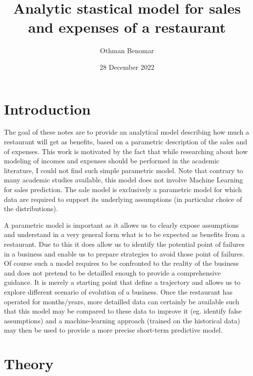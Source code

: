 \documentclass{article}
\title{Analytic stastical model for sales and expenses of a restaurant}
\date{28 December 2022\\}
\author{Othman Benomar}
\begin{document}
\maketitle
\section{Introduction} \label{sec:1} 
The goal of these notes are to provide an analytical model describing how much a restaurant will get as benefits, based on a parametric description of the sales and of expenses. This work is motivated by the fact that while researching about how modeling of incomes and expenses should be performed in the academic literature, I could not find such simple parametric model. 
Note that contrary to many academic studies available, this model does not involve Machine Learning for sales prediction. The sale model is exclusively a parametric model for which data are required to support its underlying assumptions (in particular choice of the distributions).

A parametric model is important as it allows us to clearly expose assumptions and understand in a very general form what is to be expected as benefits from a restaurant. Due to this it does allow us to identify the potential point of failures in a business and enable us to prepare strategies to avoid those point of failures. Of course such a model requires to be confronted to the reality of the business and does not pretend to be detailled enough to provide a comprehensive guidance. It is merely a starting point that define a trajectory and allows us to explore different scenario of evolution of a business. 
Once the restaurant has operated for months/years, more detailled data can certainly be available such that this model may be compared to these data to improve it (eg. identify false assumptions) and a machine-learning approach (trained on the historical data) may then be used to provide a more precise short-term predictive model.


\section{Theory} \label{sec:2}
\end{document}
